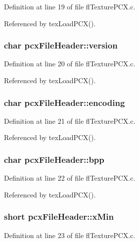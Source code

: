 Definition at line 19 of file fl\-Texture\-PCX.c.

Referenced by tex\-Load\-PCX().
\subsubsection{\setlength{\rightskip}{0pt plus 5cm}char {\bf pcx\-File\-Header::version}}\label{structpcxFileHeader_85a9ef6888cfca791c8ea5d81abcf323}




Definition at line 20 of file fl\-Texture\-PCX.c.

Referenced by tex\-Load\-PCX().
\subsubsection{\setlength{\rightskip}{0pt plus 5cm}char {\bf pcx\-File\-Header::encoding}}\label{structpcxFileHeader_5fd6d9a2cc0da5fdb7f7c455fc47dff2}




Definition at line 21 of file fl\-Texture\-PCX.c.

Referenced by tex\-Load\-PCX().
\subsubsection{\setlength{\rightskip}{0pt plus 5cm}char {\bf pcx\-File\-Header::bpp}}\label{structpcxFileHeader_2ce9823a32c4402abd555efda2264fad}




Definition at line 22 of file fl\-Texture\-PCX.c.

Referenced by tex\-Load\-PCX().
\subsubsection{\setlength{\rightskip}{0pt plus 5cm}short {\bf pcx\-File\-Header::x\-Min}}\label{structpcxFileHeader_c3538657366a57a8840f6ce8fa775517}




Definition at line 23 of file fl\-Texture\-PCX.c.

